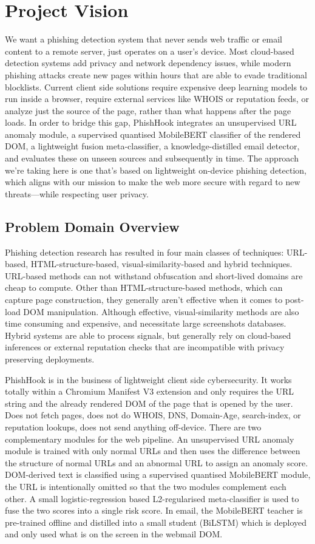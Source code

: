 \documentclass{FastFyp}
\begin{document}
\chapter{Project Vision}
\label{ch:vision}

We want a phishing detection system that never sends web traffic or email content to a remote server, just operates on a user's device. Most cloud-based detection systems add privacy and network dependency issues, while modern phishing attacks create new pages within hours that are able to evade traditional blocklists. Current client side solutions require expensive deep learning models to run inside a browser, require external services like WHOIS or reputation feeds, or analyze just the source of the page, rather than what happens after the page loads. In order to bridge this gap, PhishHook integrates an unsupervised URL anomaly module, a supervised quantised MobileBERT classifier of the rendered DOM, a lightweight fusion meta-classifier, a knowledge-distilled email detector, and evaluates these on unseen sources and subsequently in time. The approach we're taking here is one that's based on lightweight on-device phishing detection, which aligns with our mission to make the web more secure with regard to new threats—while respecting user privacy.

\section{Problem Domain Overview}
Phishing detection research has resulted in four main classes of techniques: URL-based, HTML-structure-based, visual-similarity-based and hybrid techniques. URL-based methods can not withstand obfuscation and short-lived domains are cheap to compute. Other than HTML-structure-based methods, which can capture page construction, they generally aren't effective when it comes to post-load DOM manipulation. Although effective, visual-similarity methods are also time consuming and expensive, and necessitate large screenshots databases. Hybrid systems are able to process signals, but generally rely on cloud-based inferences or external reputation checks that are incompatible with privacy preserving deployments.

PhishHook is in the business of lightweight client side cybersecurity. It works totally within a Chromium Manifest V3 extension and only requires the URL string and the already rendered DOM of the page that is opened by the user. Does not fetch pages, does not do WHOIS, DNS, Domain-Age, search-index, or reputation lookups, does not send anything off-device. There are two complementary modules for the web pipeline. An unsupervised URL anomaly module is trained with only normal URLs and then uses the difference between the structure of normal URLs and an abnormal URL to assign an anomaly score. DOM-derived text is classified using a supervised quantised MobileBERT module, the URL is intentionally omitted so that the two modules complement each other. A small logistic-regression based L2-regularised meta-classifier is used to fuse the two scores into a single risk score. In email, the MobileBERT teacher is pre-trained offline and distilled into a small student (BiLSTM) which is deployed and only used what is on the screen in the webmail DOM.
\end{document}
